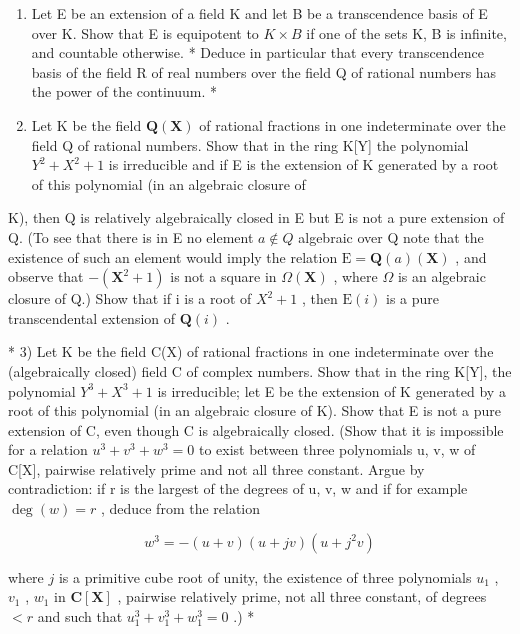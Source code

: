 \BourbakiExerciseGroup

\begin{enumerate}
\def\labelenumi{\arabic{enumi})}
\item
  Let E be an extension of a field K and let B be a transcendence basis of E over K. Show that E is equipotent to \(K \times B\) if one of the sets K, B is infinite, and countable otherwise. * Deduce in particular that every transcendence basis of the field R of real numbers over the field Q of rational numbers has the power of the continuum. *
\item
  Let K be the field \(\mathbf{Q}(\mathbf{X})\) of rational fractions in one indeterminate over the field Q of rational numbers. Show that in the ring K{[}Y{]} the polynomial \(Y^{2} + X^{2} + 1\) is irreducible and if E is the extension of K generated by a root of this polynomial (in an algebraic closure of
\end{enumerate}

K), then Q is relatively algebraically closed in E but E is not a pure extension of Q. (To see that there is in E no element \(a \notin Q\) algebraic over Q note that the existence of such an element would imply the relation \(\mathrm{E} = \mathbf{Q}(a)(\mathbf{X})\) , and observe that \(-(\mathbf{X}^{2} + 1)\) is not a square in \(\Omega(\mathbf{X})\) , where \(\Omega\) is an algebraic closure of Q.) Show that if i is a root of \(X^{2} + 1\) , then \(\mathrm{E}(i)\) is a pure transcendental extension of \(\mathbf{Q}(i)\) .

* 3) Let K be the field C(X) of rational fractions in one indeterminate over the (algebraically closed) field C of complex numbers. Show that in the ring K{[}Y{]}, the polynomial \(Y^{3} + X^{3} + 1\) is irreducible; let E be the extension of K generated by a root of this polynomial (in an algebraic closure of K). Show that E is not a pure extension of C, even though C is algebraically closed. (Show that it is impossible for a relation \(u^{3} + v^{3} + w^{3} = 0\) to exist between three polynomials u, v, w of C{[}X{]}, pairwise relatively prime and not all three constant. Argue by contradiction: if r is the largest of the degrees of u, v, w and if for example \(\deg(w) = r\) , deduce from the relation

\[
w ^ {3} = - (u + v) (u + j v) (u + j ^ {2} v)
\]

where \(j\) is a primitive cube root of unity, the existence of three polynomials \(u_1\) , \(v_1\) , \(w_1\) in \(\mathbf{C}[\mathbf{X}]\) , pairwise relatively prime, not all three constant, of degrees \(< r\) and such that \(u_1^3 + v_1^3 + w_1^3 = 0\) .) *

